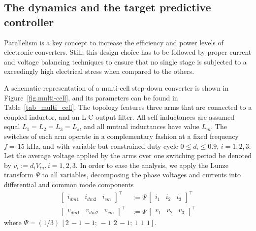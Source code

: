 \subsection{The dynamics and the target predictive controller}
\label{sec:analysis}

Parallelism is a key concept to increase the efficiency and power levels of electronic converters. Still, this design choice has to be followed by proper current and voltage balancing techniques to ensure that no single stage is subjected to a exceedingly high electrical stress when compared to the others. 

A schematic representation of a multi-cell step-down converter is shown in Figure~\ref{fig.multi-cell}, and its parameters can be found in Table~\ref{tab_multi_cell}. The topology features three arms that are connected to a coupled inductor, and an L-C output filter. All self inductances are assumed equal $L_1 = L_2 = L_3 = L_{s}$, and all mutual inductances have value $L_m$. The switches of each arm operate in a complementary fashion at a fixed frequency $f = \,$15 kHz, and with variable but constrained duty cycle $0 \leq d_i \leq 0.9, \, i=1,2,3$. Let the average voltage applied by the arms over one switching period be denoted by $v_i := d_i V_{in}, i=1,2,3$. In order to ease the analysis, we apply the Lunze transform $\Psi$ to all variables, decomposing the phase voltages and currents into differential and common mode components
\begin{align}
	\begin{bmatrix}i_{dm1} & i_{dm2} & i_{cm}\end{bmatrix}^\top &:= \Psi \, \begin{bmatrix}i_{1} & i_{2} & i_{3}\end{bmatrix}^\top \\
	\begin{bmatrix}v_{dm1} & v_{dm2} & v_{cm}\end{bmatrix}^\top &:= \Psi \, \begin{bmatrix}v_{1} & v_{2} & v_{3}\end{bmatrix}^\top
\end{align}
where $\Psi = (1/3) \, [2 \, -1 \, -1; \, -1 \ \, 2 \, -1; \, 1 \ \, 1 \ \, 1]$.

